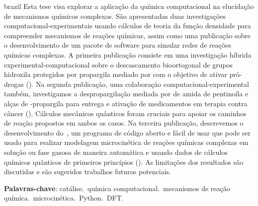\begin{resumo}[Resumo]
	\begin{otherlanguage*}{brazil}
		Esta tese visa explorar a aplicação da química computacional na elucidação de mecanismos químicos complexos.
		São apresentadas duas investigações computacional-experimentais usando cálculos de teoria da função densidade para compreender mecanismos de reações químicas,
		assim como uma publicação sobre o desenvolvimento de um pacote de software para simular redes de reações químicas complexas.
		A primeira publicação consiste em uma investigação híbrida experimental-computacional sobre o descascamento bioortogonal de grupos hidroxila protegidos por propargila mediado por  com o objetivo de ativar pró-drogas
		().
		Na segunda publicação,
		uma colaboração computacional-experimental também,
		investigamos a despropargilação mediada por  de amida de pentinoíla e alças de -propargila para entrega e ativação de medicamentos em terapia contra câncer
		().
		Cálculos mecânicos quânticos foram cruciais para apoiar os caminhos de reação propostos em ambos os casos.
		Na terceira publicação,
		descrevemos o desenvolvimento do~\overreact{},
		um programa de código aberto e fácil de usar que pode ser usado
		para realizar modelagem microcinética de reações químicas complexas em solução ou fase gasosa
		de maneira automática e
		usando dados de cálculos químicos quânticos de primeiros princípios
		().
		As limitações dos resultados são discutidas e são sugeridos trabalhos futuros potenciais.

		\vspace{\onelineskip}

		\noindent
		\textbf{Palavras-chave}:
		catálise.\ química computacional.\ mecanismos de reação química.\ microcinética.\ Python.\ DFT.\@
	\end{otherlanguage*}
\end{resumo}

